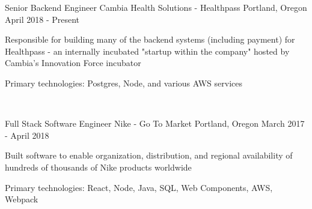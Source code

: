 
\begin{cventries}



  \cventry
  {Senior Backend Engineer}
  {Cambia Health Solutions - Healthpass}
  {Portland, Oregon}
  {April 2018 - Present}
  {
    \begin{cvitems}
      \item {Responsible for building many of the backend systems (including payment) for Healthpass - an internally incubated "startup within the company" hosted by Cambia's Innovation Force incubator}
      \item {Primary technologies: Postgres, Node, and various AWS services}
    \end{cvitems}
  }

  ~

  \cventry
  {Full Stack Software Engineer}
  {Nike - Go To Market}
  {Portland, Oregon}
  {March 2017 - April 2018}
  {
    \begin{cvitems}
      \item {Built software to enable organization, distribution, and regional availability of hundreds of thousands of Nike products worldwide}
      \item {Primary technologies: React, Node, Java, SQL, Web Components, AWS, Webpack}
    \end{cvitems}
  }

  ~




\end{cventries}
